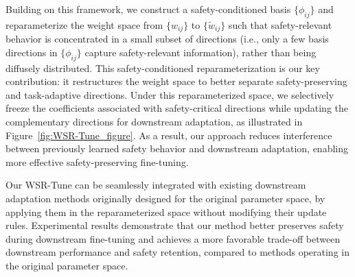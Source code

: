 \documentclass{article}
\begin{document}
Building on this framework, we construct a safety-conditioned basis $\{\phi_{ij}\}$ and reparameterize the weight space from $\{{w}_{ij}\}$ to $\{{\tilde{w}_{ij}}\}$  such that safety-relevant behavior is concentrated in a small subset of directions (i.e., only a few basis directions in $\{\phi_{ij}\}$ capture safety-relevant information), rather than being diffusely distributed.  This safety-conditioned reparameterization is our key contribution: it restructures the weight space to better separate safety-preserving and task-adaptive directions. Under this reparameterized space, we selectively freeze the coefficients associated with safety-critical directions while updating the complementary directions for downstream adaptation, as illustrated in Figure~\ref{fig:WSR-Tune_figure}. As a result, our approach reduces interference between previously learned safety behavior and downstream adaptation, enabling more effective safety-preserving fine-tuning.

Our WSR-Tune can be seamlessly integrated with existing downstream adaptation methods originally designed for the original parameter space, by applying them in the reparameterized space without modifying their update rules. Experimental results demonstrate that our method better preserves safety during downstream fine-tuning and achieves a more favorable trade-off between downstream performance and safety retention, compared to methods operating in the original parameter space. 

\vspace{-1.5mm}
\end{document}
